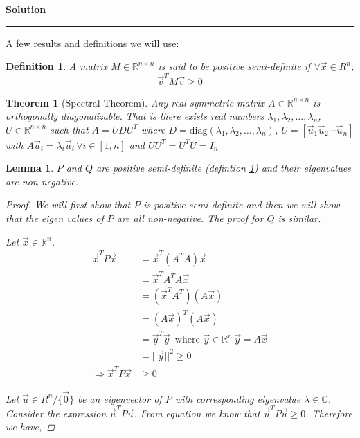 \documentclass[a4paper,12pt]{article}
\newenvironment{solution}[2][]{%
    \begin{mdframed}[linecolor=blue!70!black, linewidth=2pt, roundcorner=10pt, backgroundcolor=yellow!10!white, skipabove=12pt, skipbelow=12pt]%
        \textbf{\large #2}
        \par\noindent\rule{\textwidth}{0.4pt}
}{
    \end{mdframed}
}
\newtheorem{Def}{Definition}
\newtheorem{lemma}{Lemma}
\newtheorem{theorem}{Theorem}
\begin{document}
\begin{solution}{Solution}
      A few results and definitions we will use:
      \begin{Def}\label{psd}
         A matrix $M \in \mathbb{R}^{n \times n}$ is said to be positive semi-definite if $\forall \vec{x} \in R^{n}$,
         \[ \vec{v}^{T} M \vec{v} \geqslant 0\]
      \end{Def}
      \begin{theorem}[Spectral Theorem]\label{spectral}
        Any real symmetric matrix $A \in \mathbb{R}^{n \times n}$ is orthogonally diagonalizable. That is there exists real numbers
        $\lambda_{1},\lambda_{2}, \dots,\lambda_{n}$, $U \in \mathbb{R}^{n \times n}$ such that $A = UDU^{T}$ where 
        $D = \text{diag}(\lambda_{1},\lambda_{2},\dots,\lambda_{n})$,
        $U = \left[ \vec{u}_{1} \vec{u}_{2} \cdots \vec{u}_{n}\right]$ with 
        $A \vec{u}_{i} = \lambda_{i} \vec{u}_{i} \, \forall i \in [1,n]$ and $UU^{T} = U^{T}U = I_{n}$
      \end{theorem}
        \begin{lemma}\label{l1}
        $P$ and $Q$ are positive semi-definite (defintion \@\ref{psd}) and their eigenvalues are non-negative.
          \begin{proof}
            We will first show that $P$ is positive semi-definite and then we will show that the eigen values of $P$ 
            are all non-negative. The proof for $Q$ is similar.     
            
            Let $\vec{x} \in \mathbb{R}^{n}$. 
            \begin{align}
            \vec{x}^{T} P \vec{x} &= \vec{x}^{T}(A^{T}A) \vec{x} \nonumber \\ 
                                  &= \vec{x}^{T} A^{T} A \vec{x} \nonumber \\
                                  &= (\vec{x}^{T} A^{T}) (A \vec{x}) \nonumber \\
                                  &= {(A \vec{x})}^{T} (A\vec{x}) \nonumber \\
                                  &= \vec{y}^{T} \vec{y} \, \text{ where $\vec{y} \in \mathbb{R}^{n} \, \vec{y} = A \vec{x}$} \nonumber \\
                                  &= \lvert \lvert \vec{y} \rvert \rvert^{2} \geqslant 0 \nonumber \\
            \Rightarrow \label{r1}\vec{x}^{T} P \vec{x} &\geqslant 0
            \end{align}
            
            Let $\vec{u} \in R^{n}/\{\vec{0}\} $ be an eigenvector of $P$ with corresponding eigenvalue $\lambda \in \mathbb{C}$.
            Consider the expression $\vec{u}^{T} P \vec{u}$. From equation we know that $\vec{u}^{T} P \vec{u} \geqslant 0$.
            Therefore we have,


\end{proof}
\end{lemma}
\end{solution}
\end{document}
